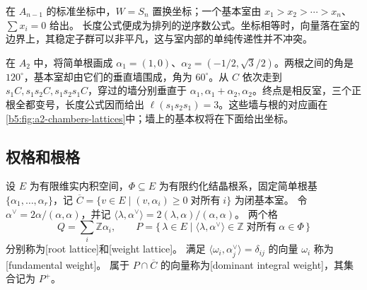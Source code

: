 在 \(A_{n-1}\) 的标准坐标中，\(W=S_n\) 置换坐标；一个基本室由 \(x_1>x_2>\cdots>x_n\)、\(\sum x_i=0\) 给出。 长度公式便成为排列的逆序数公式。坐标相等时，向量落在室的边界上，其稳定子群可以非平凡，这与室内部的单纯传递性并不冲突。

\ProseParagraphBreak

在 \(A_2\) 中，将简单根画成 \(\alpha_1=(1,0)\)、\(\alpha_2=(-1/2,\sqrt3/2)\)。两根之间的角是 \(120^\circ\)，基本室却由它们的垂直墙围成，角为 \(60^\circ\)。从 \(C\) 依次走到 \(s_1C,s_1s_2C,s_1s_2s_1C\)，穿过的墙分别垂直于 \(\alpha_1,\alpha_1+\alpha_2,\alpha_2\)。终点是相反室，三个正根全都变号，长度公式因而给出 \(\ell(s_1s_2s_1)=3\)。这些墙与根的对应画在\cref{b5:fig:a2-chambers-lattices}中；墙上的基本权将在下面给出坐标。

\subsection{权格和根格}
\label{b5:subsec:1701:03}

\begin{definition}\label{b5:def:weight-lattice}
	设 \(E\) 为有限维实内积空间，\(\Phi\subseteq E\) 为有限约化结晶根系，固定简单根基 \(\{\alpha_1,\ldots,\alpha_r\}\)，记 \(\overline C=\{v\in E\mid(v,\alpha_i)\ge0\;\text{对所有}\;i\}\) 为闭基本室。 令 \(\alpha^\vee=2\alpha/(\alpha,\alpha)\)，并记 \(\langle\lambda,\alpha^\vee\rangle=2(\lambda,\alpha)/(\alpha,\alpha)\)。 两个格
	\[
		Q=\sum_i\mathbb Z\alpha_i,\qquad P=\bigl\{\,\lambda\in E\mid \langle\lambda,\alpha^\vee\rangle\in\mathbb Z \;\text{对所有}\;\alpha\in\Phi\,\bigr\}
	\]
	分别称为[root lattice]和[weight lattice]。 满足 \(\langle\omega_i,\alpha_j^\vee\rangle=\delta_{ij}\) 的向量 \(\omega_i\) 称为[fundamental weight]。 属于 \(P\cap\overline C\) 的向量称为[dominant integral weight]，其集合记为 \(P^+\)。
\end{definition}

